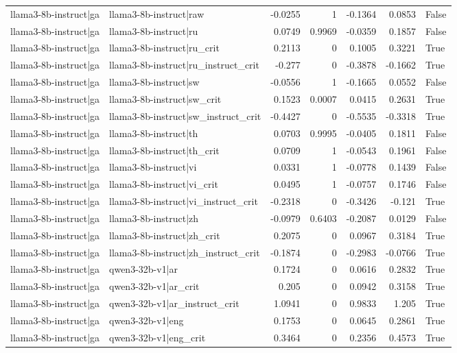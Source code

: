 \begin{table}
\begin{tabular}{l l r r r r l}
llama3-8b-instruct|ga & llama3-8b-instruct|raw & -0.0255 & 1 & -0.1364 & 0.0853 & False \\
llama3-8b-instruct|ga & llama3-8b-instruct|ru & 0.0749 & 0.9969 & -0.0359 & 0.1857 & False \\
llama3-8b-instruct|ga & llama3-8b-instruct|ru_crit & 0.2113 & 0 & 0.1005 & 0.3221 & True \\
llama3-8b-instruct|ga & llama3-8b-instruct|ru_instruct_crit & -0.277 & 0 & -0.3878 & -0.1662 & True \\
llama3-8b-instruct|ga & llama3-8b-instruct|sw & -0.0556 & 1 & -0.1665 & 0.0552 & False \\
llama3-8b-instruct|ga & llama3-8b-instruct|sw_crit & 0.1523 & 0.0007 & 0.0415 & 0.2631 & True \\
llama3-8b-instruct|ga & llama3-8b-instruct|sw_instruct_crit & -0.4427 & 0 & -0.5535 & -0.3318 & True \\
llama3-8b-instruct|ga & llama3-8b-instruct|th & 0.0703 & 0.9995 & -0.0405 & 0.1811 & False \\
llama3-8b-instruct|ga & llama3-8b-instruct|th_crit & 0.0709 & 1 & -0.0543 & 0.1961 & False \\
llama3-8b-instruct|ga & llama3-8b-instruct|vi & 0.0331 & 1 & -0.0778 & 0.1439 & False \\
llama3-8b-instruct|ga & llama3-8b-instruct|vi_crit & 0.0495 & 1 & -0.0757 & 0.1746 & False \\
llama3-8b-instruct|ga & llama3-8b-instruct|vi_instruct_crit & -0.2318 & 0 & -0.3426 & -0.121 & True \\
llama3-8b-instruct|ga & llama3-8b-instruct|zh & -0.0979 & 0.6403 & -0.2087 & 0.0129 & False \\
llama3-8b-instruct|ga & llama3-8b-instruct|zh_crit & 0.2075 & 0 & 0.0967 & 0.3184 & True \\
llama3-8b-instruct|ga & llama3-8b-instruct|zh_instruct_crit & -0.1874 & 0 & -0.2983 & -0.0766 & True \\
llama3-8b-instruct|ga & qwen3-32b-v1|ar & 0.1724 & 0 & 0.0616 & 0.2832 & True \\
llama3-8b-instruct|ga & qwen3-32b-v1|ar_crit & 0.205 & 0 & 0.0942 & 0.3158 & True \\
llama3-8b-instruct|ga & qwen3-32b-v1|ar_instruct_crit & 1.0941 & 0 & 0.9833 & 1.205 & True \\
llama3-8b-instruct|ga & qwen3-32b-v1|eng & 0.1753 & 0 & 0.0645 & 0.2861 & True \\
llama3-8b-instruct|ga & qwen3-32b-v1|eng_crit & 0.3464 & 0 & 0.2356 & 0.4573 & True \\

\end{tabular}
\end{table}
